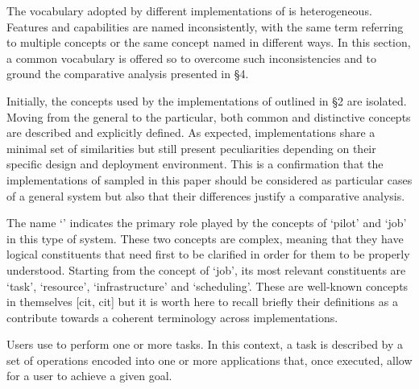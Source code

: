 \documentclass{sig-alternate}
\begin{document}

The vocabulary adopted by different implementations of \pilotjob is heterogeneous. Features and capabilities are named inconsistently, with the same term referring to multiple concepts or the same concept named in different ways. In this section, a common vocabulary is offered so to overcome such inconsistencies and to ground the comparative analysis presented in \S 4.


Initially, the concepts used by the implementations of \pilotjob outlined in \S 2 are isolated. Moving from the general to the particular, both common and distinctive concepts are described and explicitly defined. As expected, \pilotjob implementations share a minimal set of similarities but still present peculiarities depending on their specific design and deployment environment. This is a confirmation that the implementations of \pilotjob sampled in this paper should be considered as particular cases of a general \pilotjob system but also that their differences justify a comparative analysis.


The name `\pilotjob' indicates the primary role played by the concepts of `pilot' and `job' in this type of system. These two concepts are complex, meaning that they have logical constituents that need first to be clarified in order for them to be properly understood. Starting from the concept of `job', its most relevant constituents are `task', `resource', `infrastructure' and `scheduling'. These are well-known concepts in themselves [cit, cit] but it is worth here to recall briefly their definitions as a contribute towards a coherent terminology across \pilotjobs implementations. 


Users use \pilotjobs to perform one or more tasks. In this context, a task is described by a set of operations encoded into one or more applications that, once executed, allow for a user to achieve a given goal.
\end{document}

